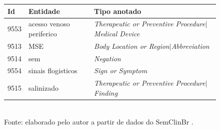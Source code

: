 \begin{figure}[htbp]
{\begin{tabular}{lll}
  \toprule
  Id & Entidade & Tipo anotado \\
  \midrule
  9553 & acesso venoso periferico & \emph{Therapeutic or Preventive Procedure}$|$\emph{Medical Device} \\
  9513 & MSE & \emph{Body Location or Region}$|$\emph{Abbreviation} \\
  9514 & sem & \emph{Negation} \\
  9554 & sinais flogisticos & \emph{Sign or Symptom} \\
  9515 & salinizado & \emph{Therapeutic or Preventive Procedure}$|$\emph{Finding} \\
  \bottomrule
  \end{tabular}}\\[4pt]
  {\footnotesize Fonte: elaborado pelo autor a partir de dados do SemClinBr \cite{oliveira_2022_semclinbr}.}
\end{figure}
